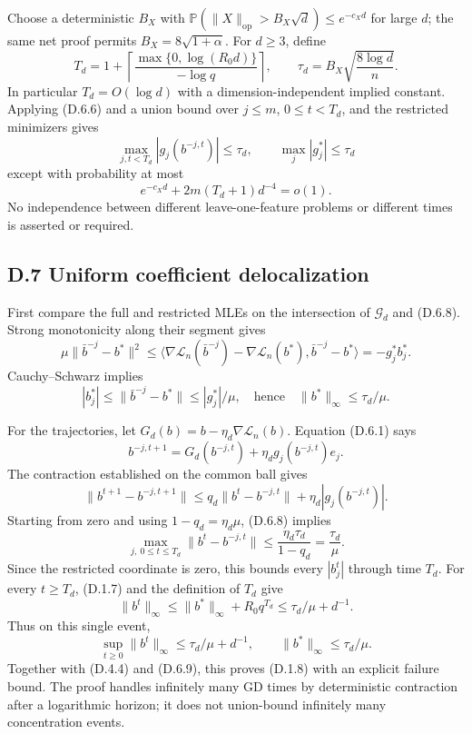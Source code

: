 \documentclass[
  11pt,
  a4paper,
]{article}
\begin{document}
Choose a deterministic \(B_X\) with
\(\mathbb P(\|X\|_{\mathrm{op}}>B_X\sqrt d)\leq e^{-c_Xd}\) for large
\(d\); the same net proof permits \(B_X=8\sqrt{1+\alpha}\). For
\(d\geq3\), define \[
T_d=1+\left\lceil\frac{\max\{0,\log(R_0d)\}}{-\log q}\right\rceil,
\qquad
\tau_d=B_X\sqrt{\frac{8\log d}{n}}.
\tag{D.6.7}
\] In particular \(T_d=O(\log d)\) with a dimension-independent implied
constant. Applying (D.6.6) and a union bound over \(j\leq m\),
\(0\leq t<T_d\), and the restricted minimizers gives \[
\max_{j,t<T_d}|g_j(b^{-j,t})|\leq\tau_d,
\qquad \max_j|g_j^*|\leq\tau_d
\tag{D.6.8}
\] except with probability at most \[
e^{-c_Xd}+2m(T_d+1)d^{-4}=o(1).
\tag{D.6.9}
\] No independence between different leave-one-feature problems or
different times is asserted or required.

\hypertarget{d.7-uniform-coefficient-delocalization}{%
\subsection{D.7 Uniform coefficient
delocalization}\label{d.7-uniform-coefficient-delocalization}}

First compare the full and restricted MLEs on the intersection of
\(\mathcal G_d\) and (D.6.8). Strong monotonicity along their segment
gives \[
\mu\|\bar b^{-j}-b^*\|^2
\leq\langle\nabla\mathcal L_n(\bar b^{-j})-
 \nabla\mathcal L_n(b^*),\bar b^{-j}-b^*\rangle
=-g_j^*b_j^*.
\] Cauchy--Schwarz implies \[
|b_j^*|\leq\|\bar b^{-j}-b^*\|\leq|g_j^*|/\mu,
\quad\text{hence}\quad \|b^*\|_\infty\leq\tau_d/\mu.
\tag{D.7.1}
\]

For the trajectories, let \(G_d(b)=b-\eta_d\nabla\mathcal L_n(b)\).
Equation (D.6.1) says \[
b^{-j,t+1}=G_d(b^{-j,t})+\eta_dg_j(b^{-j,t})e_j.
\] The contraction established on the common ball gives \[
\|b^{t+1}-b^{-j,t+1}\|
\leq q_d\|b^t-b^{-j,t}\|+\eta_d|g_j(b^{-j,t})|.
\tag{D.7.2}
\] Starting from zero and using \(1-q_d=\eta_d\mu\), (D.6.8) implies \[
\max_{j,\ 0\leq t\leq T_d}\|b^t-b^{-j,t}\|
\leq\frac{\eta_d\tau_d}{1-q_d}=\frac{\tau_d}{\mu}.
\tag{D.7.3}
\] Since the restricted coordinate is zero, this bounds every
\(|b_j^t|\) through time \(T_d\). For every \(t\geq T_d\), (D.1.7) and
the definition of \(T_d\) give \[
\|b^t\|_\infty\leq\|b^*\|_\infty+R_0q^{T_d}
\leq\tau_d/\mu+d^{-1}.
\tag{D.7.4}
\] Thus on this single event, \[
\boxed{\quad\sup_{t\geq0}\|b^t\|_\infty
\leq\tau_d/\mu+d^{-1},\qquad \|b^*\|_\infty\leq\tau_d/\mu.\quad}
\tag{D.7.5}
\] Together with (D.4.4) and (D.6.9), this proves (D.1.8) with an
explicit failure bound. The proof handles infinitely many GD times by
deterministic contraction after a logarithmic horizon; it does not
union-bound infinitely many concentration events.
\end{document}
